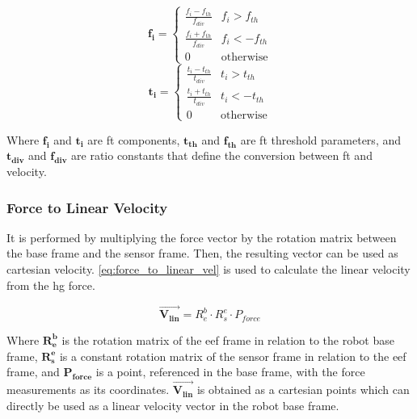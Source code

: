 \begin{multicols}{2}
    \begin{equation}
        \mathbf{f_i} =
        \begin{cases}
          \frac{f_i - f_{th}}{f_{div}} & f_i > f_{th}\\
          \frac{f_i + f_{th}}{f_{div}} & f_i < -f_{th}\\
          0 & \text{otherwise}
        \end{cases}
        \label{eq:f_thresh}
    \end{equation}\break
    \begin{equation}
        \mathbf{t_i} =
        \begin{cases}
          \frac{t_i - t_{th}}{t_{div}} & t_i > t_{th}\\
          \frac{t_i + t_{th}}{t_{div}} & t_i < -t_{th}\\
          0 & \text{otherwise}
        \end{cases}
        \label{eq:t_thresh} 
    \end{equation}
\end{multicols}

\noindent Where $\mathbf{f_i}$ and $\mathbf{t_i}$ are \ac{ft} components, $\mathbf{t_{th}}$ and $\mathbf{f_{th}}$ are \ac{ft} threshold parameters, and $\mathbf{t_{div}}$ and $\mathbf{f_{div}}$ are ratio constants that define the conversion between \ac{ft} and velocity.

\subsubsection{Force to Linear Velocity}


\par It is performed by multiplying the force vector by the rotation matrix between the base frame and the sensor frame. Then, the resulting vector can be used as cartesian velocity. \autoref{eq:force_to_linear_vel} is used to calculate the linear velocity from the \ac{hg} force.

\begin{equation}
    \vec{\mathbf{V_{lin}}} = R^b_e \cdot R^e_s \cdot P_{force}
    \label{eq:force_to_linear_vel}
\end{equation}

\noindent Where $\mathbf{R^b_e}$ is the rotation matrix of the \ac{eef} frame in relation to the robot base frame, $\mathbf{R^e_s}$ is a constant rotation matrix of the sensor frame in relation to the \ac{eef} frame, and $\mathbf{P_{force}}$ is a point, referenced in the base frame, with the force measurements as its coordinates. $\vec{\mathbf{V_{lin}}}$ is obtained as a cartesian points which can directly be used as a linear velocity vector in the robot base frame.

